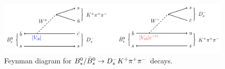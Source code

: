 

\begin{figure}[h]
\centering
\includegraphics[height=!,width=\textwidth]{figs/feynman.png}
\caption{Feynman diagram for $B_s^0/\bar B_s^0 \rightarrow D_s^- K^+ {{\pi}^+} {{\pi}^-}$ decays.}
\label{fig:decay_feynman}
\end{figure}


